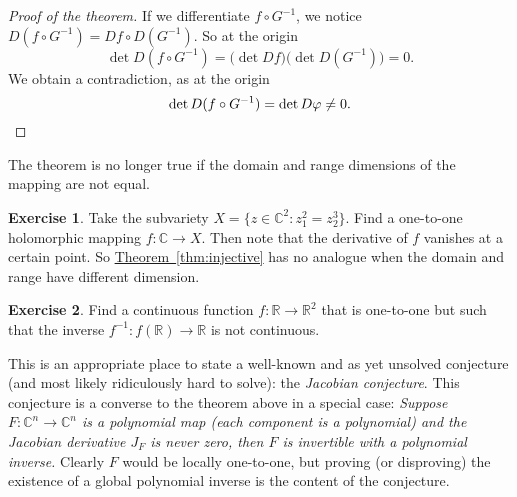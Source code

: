 \documentclass[12pt,openany]{book}
\newcommand{\C}{{\mathbb{C}}}
\newcommand{\R}{{\mathbb{R}}}
\newcommand{\myindex}[1]{#1\index{#1}}
\theoremstyle{plain}
\theoremstyle{remark}
\theoremstyle{definition}
\newenvironment{exbox}{%
    \def\FrameCommand{\vrule width 1pt \relax\hspace{10pt}}%
    \MakeFramed {\advance \hsize -\width \FrameRestore}%
}{%
    \endMakeFramed
}
\theoremstyle{exercise}
\newtheorem{exercise}{Exercise}[section]
\theoremstyle{example}
\newcommand{\thmref}[1]{\hyperref[#1]{Theorem~\ref*{#1}}}
\begin{document}
\begin{proof}[Proof of the theorem]
If we differentiate $f \circ G^{-1}$, we notice 
$D(f \circ G^{-1}) = Df \circ D(G^{-1})$.
So at the origin
\begin{equation*}
\det D(f \circ G^{-1}) = \bigl(\det Df\bigr) \bigl(\det D(G^{-1})\bigr) = 0.
\end{equation*}
We obtain a contradiction, as at the origin
\begin{equation*}
\det 
D(f \circ G^{-1})
= \det D\varphi \not= 0 . \qedhere
\end{equation*}
\end{proof}

The theorem is no longer true if the domain and range dimensions of the
mapping are not equal.

\begin{exbox}
\begin{exercise}
Take the subvariety
$X = \bigl\{ z \in \C^2 : z_1^2 = z_2^3 \bigr\}$.
Find a one-to-one holomorphic mapping $f \colon \C \to X$.
Then note that the derivative of $f$ vanishes at a certain point.
So \thmref{thm:injective} has no analogue when the domain and range have
different dimension.
\end{exercise}

\begin{exercise}
Find a continuous function $f \colon \R \to \R^2$ that is one-to-one but
such that the inverse $f^{-1} \colon f(\R) \to \R$ is not continuous.
\end{exercise}
\end{exbox}

\pagebreak[1]
This is an appropriate place to state a well-known and as yet unsolved conjecture (and most
likely ridiculously hard to solve):
the \emph{\myindex{Jacobian conjecture}}.
This conjecture is a converse to the 
theorem above in a special case:
\emph{Suppose $F \colon \C^n \to \C^n$ is a polynomial map (each component is a
polynomial) and the Jacobian derivative $J_F$ is never zero, then $F$ is
invertible with a polynomial inverse.}
Clearly $F$ would be locally one-to-one, but proving (or
disproving)
the existence of a global polynomial inverse is the content of the conjecture.
\end{document}
